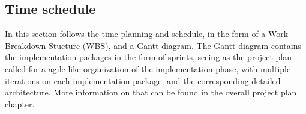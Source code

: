 \subsection{Time schedule}
In this section follows the time planning and schedule, in the form of a Work Breakdown Stucture (WBS), and a Gantt diagram.
The Gantt diagram contains the implementation packages in the form of sprints, seeing as the project plan called for a agile-like organization of the implementation phase, with multiple iterations on each implementation package, and the corresponding detailed architecture. More information on that can be found in the overall project plan chapter.

